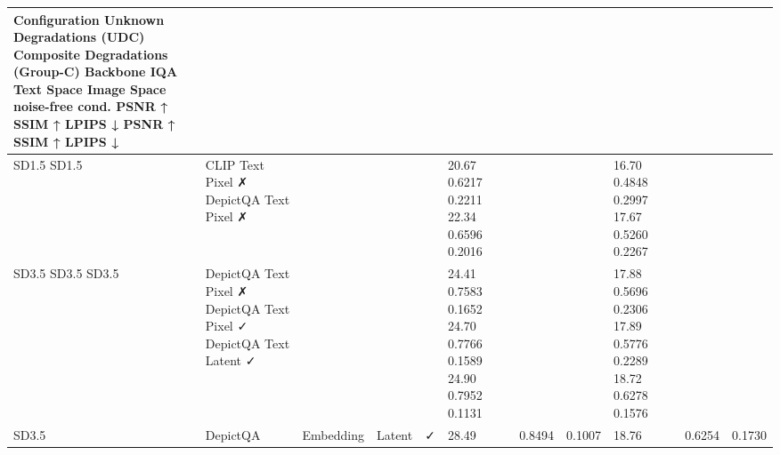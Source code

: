 \begin{tabular}{lllllllllll}
\toprule
Configuration Unknown Degradations (UDC) Composite Degradations (Group-C) Backbone IQA Text Space Image Space noise-free cond. PSNR ↑ SSIM ↑ LPIPS ↓ PSNR ↑ SSIM ↑ LPIPS ↓ &  &  &  &  &  &  &  &  &  &  \\
\midrule
SD1.5 SD1.5 & CLIP Text Pixel ✗ DepictQA Text Pixel ✗ &  &  &  & 20.67 0.6217 0.2211 22.34 0.6596 0.2016 &  &  & 16.70 0.4848 0.2997 17.67 0.5260 0.2267 &  &  \\
SD3.5 SD3.5 SD3.5 & DepictQA Text Pixel ✗ DepictQA Text Pixel ✓ DepictQA Text Latent ✓ &  &  &  & 24.41 0.7583 0.1652 24.70 0.7766 0.1589 24.90 0.7952 0.1131 &  &  & 17.88 0.5696 0.2306 17.89 0.5776 0.2289 18.72 0.6278 0.1576 &  &  \\
SD3.5 & DepictQA & Embedding & Latent & ✓ & 28.49 & 0.8494 & 0.1007 & 18.76 & 0.6254 & 0.1730 \\
\bottomrule
\end{tabular}
